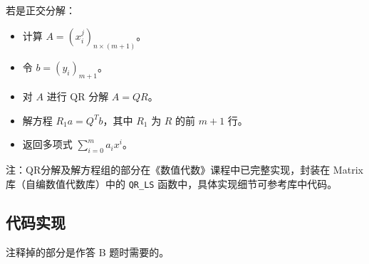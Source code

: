 \documentclass{ctexart}
\begin{document}
若是正交分解：
\begin{itemize}
\item 计算 $A=(x_i^j)_{n\times (m+1)}$。
\item 令 $b=(y_i)_{m+1}$。
\item 对 $A$ 进行 QR 分解 $A=QR$。
\item 解方程 $R_1a=Q^Tb$，其中 $R_1$ 为 $R$ 的前 $m+1$ 行。
\item 返回多项式 $\sum_{i=0}^ma_ix^i$。
\end{itemize}

注：QR分解及解方程组的部分在《数值代数》课程中已完整实现，封装在 Matrix 库（自编数值代数库）中的 \verb|QR_LS| 函数中，具体实现细节可参考库中代码。

\subsection{代码实现}
注释掉的部分是作答 B 题时需要的。
\end{document}
